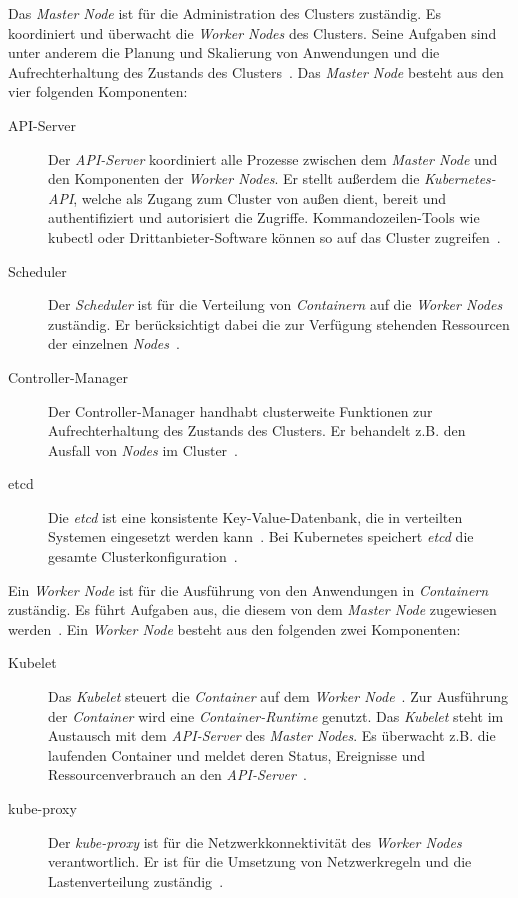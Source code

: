 Das \textit{Master Node} ist für die Administration des Clusters zuständig. Es koordiniert und überwacht die \textit{Worker Nodes} des Clusters.
Seine Aufgaben sind unter anderem die Planung und Skalierung von Anwendungen und die Aufrechterhaltung des Zustands des Clusters~\cite{kubernetes-cluster-vmware}.
Das \textit{Master Node} besteht aus den vier folgenden Komponenten:
\begin{description}
      \item[API-Server]
            Der \textit{API-Server} koordiniert alle Prozesse zwischen dem \textit{Master Node} und den Komponenten der \textit{Worker Nodes}.
            Er stellt außerdem die \textit{Kubernetes-API}, welche als Zugang zum Cluster von außen dient, bereit und authentifiziert und autorisiert die Zugriffe.
            Kommandozeilen-Tools wie kubectl oder Drittanbieter-Software können so auf das Cluster zugreifen~\cite{kubernetes-devopscube}.
      \item[Scheduler]
            Der \textit{Scheduler} ist für die Verteilung von \textit{Containern} auf die \textit{Worker Nodes} zuständig.
            Er berücksichtigt dabei die zur Verfügung stehenden Ressourcen der einzelnen \textit{Nodes}~\cite{kubernetes-cluster-ionos}.
      \item[Controller-Manager]
            Der Controller-Manager handhabt clusterweite Funktionen zur Aufrechterhaltung des Zustands des Clusters. Er behandelt z.B. den Ausfall von \textit{Nodes}
            im Cluster~\cite{kubernetes-in-action-introduction}.
      \item[etcd]
            Die \textit{etcd} ist eine konsistente Key-Value-Datenbank, die in verteilten Systemen eingesetzt werden kann~\cite{etcd-ibm}.
            Bei Kubernetes speichert \textit{etcd} die gesamte Clusterkonfiguration~\cite{kubernetes-in-action-introduction}.
\end{description}

Ein \textit{Worker Node} ist für die Ausführung von den Anwendungen in \textit{Containern} zuständig.
Es führt Aufgaben aus, die diesem von dem \textit{Master Node} zugewiesen werden~\cite{kubernetes-cluster-vmware}.
Ein \textit{Worker Node} besteht aus den folgenden zwei Komponenten:
\begin{description}
      \item[Kubelet]
            Das \textit{Kubelet} steuert die \textit{Container} auf dem \textit{Worker Node}~\cite{kubernetes-in-action-introduction}.
            Zur Ausführung der \textit{Container} wird eine \textit{Container-Runtime} genutzt.
            Das \textit{Kubelet} steht im Austausch mit dem \textit{API-Server} des \textit{Master Nodes}. Es überwacht z.B. die laufenden Container
            und meldet deren Status, Ereignisse und Ressourcenverbrauch an den \textit{API-Server}~\cite{kubernetes-in-action-chapter-11}.
      \item[kube-proxy]
            Der \textit{kube-proxy} ist für die Netzwerkkonnektivität des \textit{Worker Nodes} verantwortlich.
            Er ist für die Umsetzung von Netzwerkregeln und die Lastenverteilung zuständig~\cite{kubernetes-in-action-introduction,kubernetes-cluster-vmware}.
\end{description}

